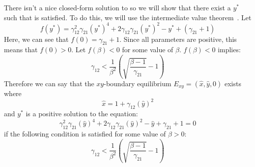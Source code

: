 There isn't a nice closed-form solution to  so we will show that there exist a $y^*$ such that  is satisfied. To do this, we will use the intermediate value theorem~\cite{book:2946356}. Let
\[
f\left(y^*\right)=\gamma_{12}^2\gamma_{21}\left(y^*\right)^4+2\gamma_{12}\gamma_{21}\left(y^*\right)^2-y^*+\left(\gamma_{21}+1\right)
\]
Here, we can see that $f(0)=\gamma_{21}+1$. Since all parameters are positive, this means that $f(0)>0$. Let $f(\beta)<0$ for some value of $\beta$. $f\left(\beta\right)<0$ implies:
\[
\gamma_{12}<\frac1{\beta^2}\left(\sqrt{\frac{\beta-1}{\gamma_{21}}}-1\right)
\]
Therefore we can say that the $xy$-boundary equilibrium $E_{xy}=\left(\hat{x},\hat{y},0\right)$ exists where
\[
\hat{x}=1+\gamma_{12}\left(\hat{y}\right)^2
\]
and $y^*$ is a positive solution to the equation:
\[
\gamma_{12}^2\gamma_{21}\left(\hat{y}\right)^4+2\gamma_{12}\gamma_{21}\left(\hat{y}\right)^2-\hat{y}+\gamma_{21}+1=0
\]
if the following condition is satisfied for some value of $\beta>0$:
\[
\gamma_{12}<\frac1{\beta^2}\left(\sqrt{\frac{\beta-1}{\gamma_{21}}}-1\right)
\]

